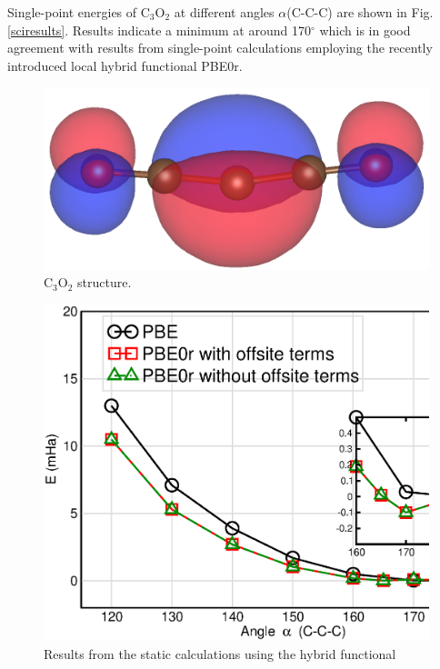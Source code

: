 \documentclass[%
 reprint,
nofootinbib,
 amsmath,amssymb,
 aps,
]{revtex4-2}
\begin{document}
\break
Single-point energies of C$_3$O$_2$ at different angles $\alpha$(C-C-C) are shown in Fig. \ref{sciresults}. Results indicate a minimum at around 170$^\circ$ which is in good agreement with results from single-point calculations employing the recently introduced local hybrid functional PBE0r\cite{PBE0rBloechl}. 

\begin{figure}
    \centering
    \includegraphics[width=\columnwidth]{homo3.png}
    \caption{C$_3$O$_2$ structure.}
    \label{structure}
\end{figure}
\begin{figure}
    \centering
    \includegraphics[width=\columnwidth]{bent_wings.eps}
    \caption{Results from the static calculations using the hybrid functional}
    \label{hybridresults}
\end{figure}
\end{document}
